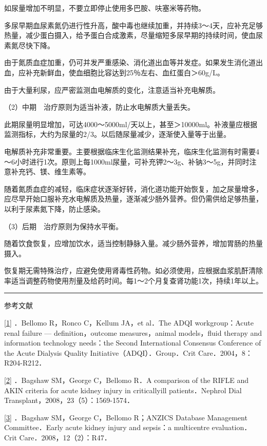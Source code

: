 如尿量增加不明显，不要立即停止使用多巴胺、呋塞米等药物。

多尿早期血尿素氮仍进行性升高，酸中毒也继续加重，并持续3～4天，应补充足够热量，减少蛋白摄入，给予蛋白合成激素，尽量缩短多尿早期的持续时间，使血尿素氮尽快下降。

由于氮质血症加重，仍可并发严重感染、消化道出血等并发症。如果发生消化道出血，应补充新鲜血，使血细胞比容达到25％左右、血红蛋白＞60g/L。

由于大量利尿，应严密监测血电解质的变化，注意适当补充电解质。

（2）中期　治疗原则为适当补液，防止水电解质大量丢失。

此期尿量明显增加，可达4000～5000ml/天以上，甚至＞10000ml。补液量应根据监测指标，大约为尿量的2/3。以后随尿量减少，逐渐使入量等于出量。

电解质补充非常重要。主要根据临床生化监测结果补充，临床生化监测有时需要4～6小时进行1次。原则上每1000ml尿量，可补充钾2～3g、补钠3～5g，并同时注意补充钙、镁、维生素等。

随着氮质血症的减轻，临床症状逐渐好转，消化道功能开始恢复，加之尿量增多，应尽早开始口服补充水电解质及热量，逐渐减少肠外营养。但仍需供给足够热量，以利于尿素氮下降，防止感染。

（3）后期　治疗原则为保持水平衡。

随着饮食恢复，应增加饮水，适当控制静脉入量。减少肠外营养，增加胃肠的热量摄入。

恢复期无需特殊治疗，应避免使用肾毒性药物。如必须使用，应根据血浆肌酐清除率适当调整药物使用剂量及给药时间。每1～2个月复查肾功能1次，持续1年以上。

\begin{center}\rule{0.5\linewidth}{\linethickness}\end{center}

参考文献

\protect\hyperlink{text00017.htmlux5cux23ch1-16-back}{{[}1{]}} ．Bellomo
R，Ronco C，Kellum JA，et al．The ADQI workgroup：Acute renal failure
--- definition，outcome measures，animal models，fluid therapy and
information technology needs：the Second International Consensus
Conference of the Acute Dialysis Quality Initiative（ADQI）．Group．Crit
Care．2004，8：R204-R212．

\protect\hyperlink{text00017.htmlux5cux23ch2-16-back}{{[}2{]}} ．Bagshaw
SM，George C，Bellomo R．A comparison of the RIFLE and AKIN criteria for
acute kidney injury in criticallyill patients．Nephrol Dial
Transplant，2008，23（5）：1569-1574．

\protect\hyperlink{text00017.htmlux5cux23ch3-16-back}{{[}3{]}} ．Bagshaw
SM，George C，Bellomo R；ANZICS Database Management Committee．Early
acute kidney injury and sepsis：a multicentre evaluation．Crit
Care．2008，12（2）：R47．

